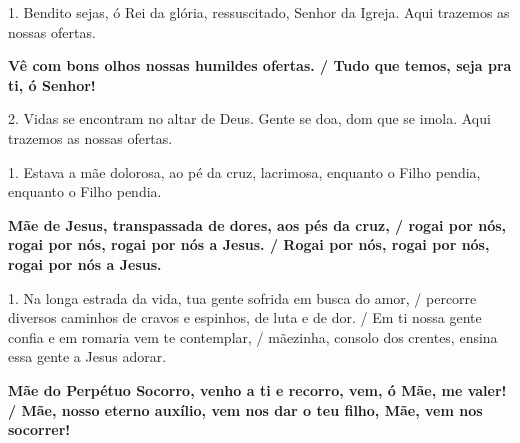 \documentclass[a5paper,9pt]{extarticle}
\begin{document}
\begin{cantos}
\begin{canto}
1. Bendito sejas, ó Rei da glória, ressuscitado, Senhor da Igreja. Aqui trazemos as nossas ofertas.

\textbf{Vê com bons olhos nossas humildes ofertas. / Tudo que temos, seja pra ti, ó Senhor!}

2. Vidas se encontram no altar de Deus. Gente se doa, dom que se imola. Aqui trazemos as nossas ofertas.
\end{canto}

\begin{canto}
1. Estava a mãe dolorosa, ao pé da cruz, lacrimosa, enquanto o Filho pendia, enquanto o Filho pendia.

\textbf{Mãe de Jesus, transpassada de dores, aos pés da cruz, / rogai por nós, rogai por nós, rogai por nós a Jesus. / Rogai por nós, rogai por nós, rogai por nós a Jesus.}
\end{canto}

\begin{canto}
1. Na longa estrada da vida, tua gente sofrida em busca do amor, / percorre diversos caminhos de cravos e espinhos, de luta e de dor. / Em ti nossa gente confia e em romaria vem te contemplar, / mãezinha, consolo dos crentes, ensina essa gente a Jesus adorar.

\textbf{Mãe do Perpétuo Socorro, venho a ti e recorro, vem, ó Mãe, me valer! / Mãe, nosso eterno auxílio, vem nos dar o teu filho, Mãe, vem nos socorrer!}
\end{canto}

\end{cantos}
\end{document}
